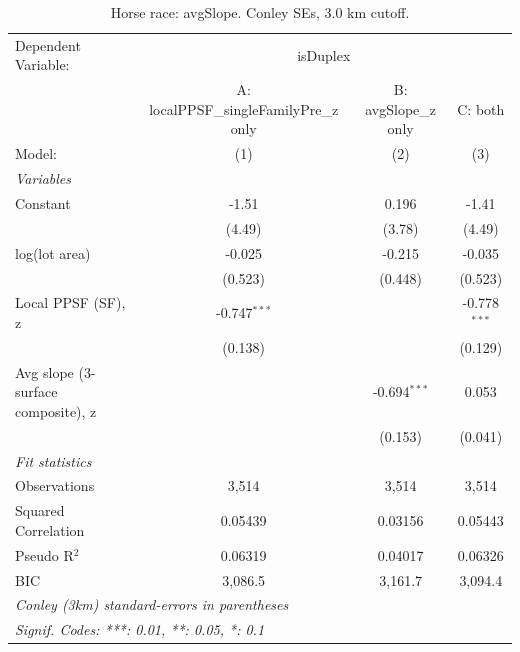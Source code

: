 
\begin{table}[htbp]
   \caption{\label{tab:horseRace_avgSlope_conley} Horse race: avgSlope. Conley SEs, 3.0 km cutoff.}
   \centering
   \begin{tabular}{lccc}
      \tabularnewline \midrule \midrule
      Dependent Variable: & \multicolumn{3}{c}{isDuplex}\\
                                         & A: localPPSF\_singleFamilyPre\_z only   & B: avgSlope\_z only  & C: both \\   
      Model:                             & (1)                                     & (2)                  & (3)\\  
      \midrule
      \emph{Variables}\\
      Constant                           & -1.51                                   & 0.196                & -1.41\\   
                                         & (4.49)                                  & (3.78)               & (4.49)\\   
      log(lot area)                      & -0.025                                  & -0.215               & -0.035\\   
                                         & (0.523)                                 & (0.448)              & (0.523)\\   
      Local PPSF (SF), z                 & -0.747$^{***}$                          &                      & -0.778$^{***}$\\   
                                         & (0.138)                                 &                      & (0.129)\\   
      Avg slope (3-surface composite), z &                                         & -0.694$^{***}$       & 0.053\\   
                                         &                                         & (0.153)              & (0.041)\\   
      \midrule
      \emph{Fit statistics}\\
      Observations                       & 3,514                                   & 3,514                & 3,514\\  
      Squared Correlation                & 0.05439                                 & 0.03156              & 0.05443\\  
      Pseudo R$^2$                       & 0.06319                                 & 0.04017              & 0.06326\\  
      BIC                                & 3,086.5                                 & 3,161.7              & 3,094.4\\  
      \midrule \midrule
      \multicolumn{4}{l}{\emph{Conley (3km) standard-errors in parentheses}}\\
      \multicolumn{4}{l}{\emph{Signif. Codes: ***: 0.01, **: 0.05, *: 0.1}}\\
   \end{tabular}
\end{table}


